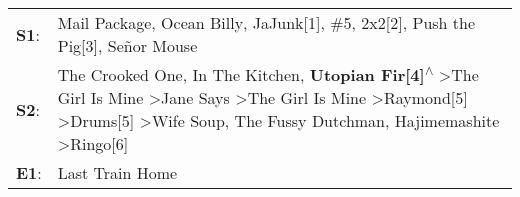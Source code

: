 \begin{supertabular}{p{0.03\textwidth}p{0.92\textwidth}}
 \textbf{S1}:  &                                                                                                                                                                                                                                                                                                                                           Mail Package\textsuperscript{}, \enspace Ocean Billy\textsuperscript{}, \enspace JaJunk[1]\textsuperscript{}, \enspace \#5\textsuperscript{}, \enspace 2x2[2]\textsuperscript{}, \enspace Push the Pig[3]\textsuperscript{}, \enspace Señor Mouse\textsuperscript{}  \enspace  \\
 \textbf{S2}:  &  The Crooked One\textsuperscript{}, \enspace In The Kitchen\textsuperscript{}, \enspace \textbf{Utopian Fir[4]\textsuperscript{$\wedge$}} \textgreater \enspace The Girl Is Mine\textsuperscript{} \textgreater \enspace Jane Says\textsuperscript{} \textgreater \enspace The Girl Is Mine\textsuperscript{} \textgreater \enspace Raymond[5]\textsuperscript{} \textgreater \enspace Drums[5]\textsuperscript{} \textgreater \enspace Wife Soup\textsuperscript{}, \enspace The Fussy Dutchman\textsuperscript{}, \enspace Hajimemashite\textsuperscript{} \textgreater \enspace Ringo[6]\textsuperscript{}  \enspace  \\
 \textbf{E1}:  &                                                                                                                                                                                                                                                                                                                                                                                                                                                                                                                                                                             Last Train Home\textsuperscript{}  \enspace  \\
\end{supertabular}
